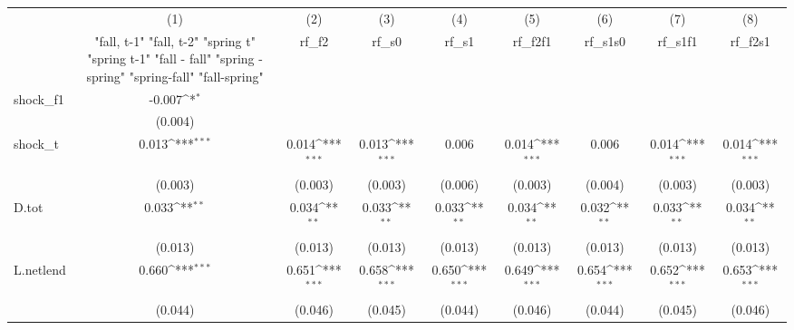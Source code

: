 {
\def\sym#1{\ifmmode^{#1}\else\(^{#1}\)\fi}
\begin{tabular}{l*{8}{c}}
\toprule
            &\multicolumn{1}{c}{(1)}&\multicolumn{1}{c}{(2)}&\multicolumn{1}{c}{(3)}&\multicolumn{1}{c}{(4)}&\multicolumn{1}{c}{(5)}&\multicolumn{1}{c}{(6)}&\multicolumn{1}{c}{(7)}&\multicolumn{1}{c}{(8)}\\
            &\multicolumn{1}{c}{  "fall, t-1" "fall, t-2" "spring t" "spring t-1"  "fall - fall" "spring - spring" "spring-fall" "fall-spring" }&\multicolumn{1}{c}{rf\_f2}&\multicolumn{1}{c}{rf\_s0}&\multicolumn{1}{c}{rf\_s1}&\multicolumn{1}{c}{rf\_f2f1}&\multicolumn{1}{c}{rf\_s1s0}&\multicolumn{1}{c}{rf\_s1f1}&\multicolumn{1}{c}{rf\_f2s1}\\
\midrule
shock\_f1    &      -0.007\sym{*}  &                     &                     &                     &                     &                     &                     &                     \\
            &     (0.004)         &                     &                     &                     &                     &                     &                     &                     \\
\addlinespace
shock\_t     &       0.013\sym{***}&       0.014\sym{***}&       0.013\sym{***}&       0.006         &       0.014\sym{***}&       0.006         &       0.014\sym{***}&       0.014\sym{***}\\
            &     (0.003)         &     (0.003)         &     (0.003)         &     (0.006)         &     (0.003)         &     (0.004)         &     (0.003)         &     (0.003)         \\
\addlinespace
D.tot       &       0.033\sym{**} &       0.034\sym{**} &       0.033\sym{**} &       0.033\sym{**} &       0.034\sym{**} &       0.032\sym{**} &       0.033\sym{**} &       0.034\sym{**} \\
            &     (0.013)         &     (0.013)         &     (0.013)         &     (0.013)         &     (0.013)         &     (0.013)         &     (0.013)         &     (0.013)         \\
\addlinespace
L.netlend   &       0.660\sym{***}&       0.651\sym{***}&       0.658\sym{***}&       0.650\sym{***}&       0.649\sym{***}&       0.654\sym{***}&       0.652\sym{***}&       0.653\sym{***}\\
            &     (0.044)         &     (0.046)         &     (0.045)         &     (0.044)         &     (0.046)         &     (0.044)         &     (0.045)         &     (0.046)         \\

\end{tabular}}
